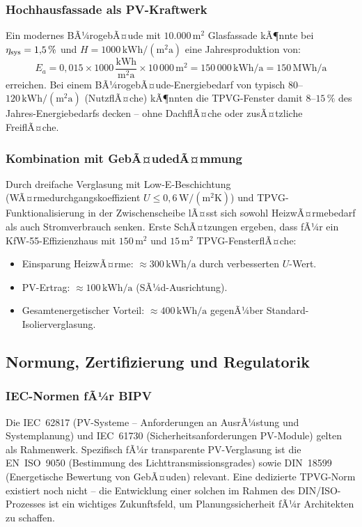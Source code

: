 ﻿\documentclass[a4paper,12pt]{article}
\theoremstyle{definition}
\theoremstyle{remark}
\begin{document}
\subsubsection{Hochhausfassade als PV-Kraftwerk}
Ein modernes BÃ¼rogebÃ¤ude mit $10.000\,\mathrm{m^2}$ Glasfassade kÃ¶nnte bei
$\eta_{\rm sys} = 1{,}5\,\%$ und $H = 1000\,\mathrm{kWh/(m^2 a)}$
eine Jahresproduktion von:
\begin{equation*}
  E_a = 0{,}015 \times 1000\,\frac{\mathrm{kWh}}{\mathrm{m^2 a}} \times 10\,000\,\mathrm{m^2}
      = 150\,000\,\mathrm{kWh/a} = 150\,\mathrm{MWh/a}
\end{equation*}
erreichen. Bei einem BÃ¼rogebÃ¤ude-Energiebedarf von typisch
$80$--$120\,\mathrm{kWh/(m^2 a)}$ (NutzflÃ¤che) kÃ¶nnten die TPVG-Fenster
damit $8$--$15\,\%$ des Jahres-Energiebedarfs decken -- ohne DachflÃ¤che
oder zusÃ¤tzliche FreiflÃ¤che.

\subsubsection{Kombination mit GebÃ¤udedÃ¤mmung}
Durch dreifache Verglasung mit Low-E-Beschichtung (WÃ¤rmedurchgangskoeffizient
$U \leq 0{,}6\,\mathrm{W/(m^2 K)}$) und TPVG-Funktionalisierung in
der Zwischenscheibe lÃ¤sst sich sowohl HeizwÃ¤rmebedarf als auch
Stromverbrauch senken. Erste SchÃ¤tzungen ergeben,
dass fÃ¼r ein KfW-55-Effizienzhaus mit $150\,\mathrm{m^2}$ und
$15\,\mathrm{m^2}$ TPVG-FensterflÃ¤che:
\begin{itemize}
  \item Einsparung HeizwÃ¤rme: $\approx 300\,\mathrm{kWh/a}$ durch
    verbesserten $U$-Wert.
  \item PV-Ertrag: $\approx 100\,\mathrm{kWh/a}$ (SÃ¼d-Ausrichtung).
  \item Gesamtenergetischer Vorteil: $\approx 400\,\mathrm{kWh/a}$
    gegenÃ¼ber Standard-Isolierverglasung.
\end{itemize}

\subsection{Normung, Zertifizierung und Regulatorik}

\subsubsection{IEC-Normen fÃ¼r BIPV}
Die IEC~62817 (PV-Systeme -- Anforderungen an AusrÃ¼stung und
Systemplanung) und IEC~61730 (Sicherheitsanforderungen PV-Module) gelten
als Rahmenwerk. Spezifisch fÃ¼r transparente PV-Verglasung ist die
EN~ISO~9050 (Bestimmung des Lichttransmissionsgrades) sowie
DIN~18599 (Energetische Bewertung von GebÃ¤uden) relevant. Eine
dedizierte TPVG-Norm existiert noch nicht -- die Entwicklung einer
solchen im Rahmen des DIN/ISO-Prozesses ist ein wichtiges
Zukunftsfeld, um Planungssicherheit fÃ¼r Architekten zu schaffen.
\end{document}
